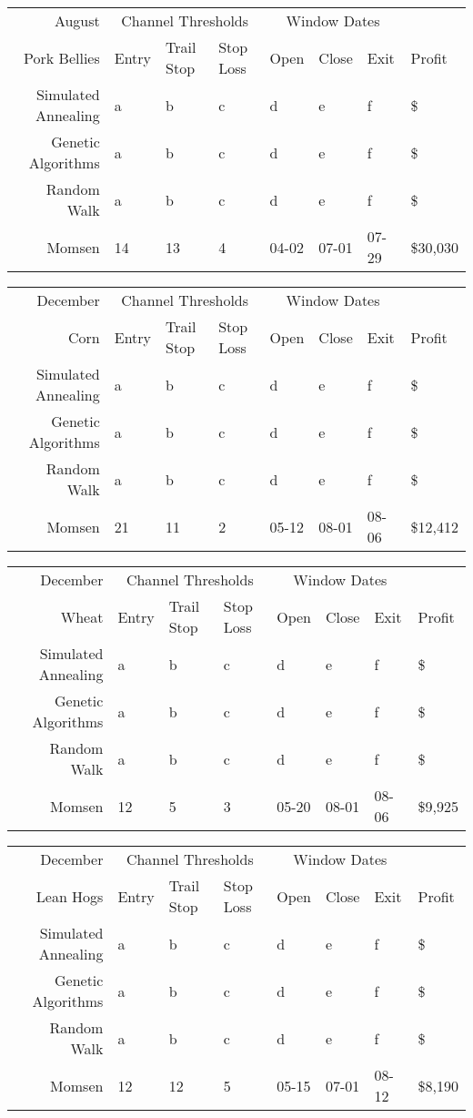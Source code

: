 \documentclass[12pt]{article}
\begin{document}
\begin{tabular}{|r|l|l|l|l|l|l|l|}
  \hline
  August & \multicolumn{3}{|c|}{Channel Thresholds} & \multicolumn{3}{|c|}{Window Dates} &  \\
  Pork Bellies & Entry & Trail Stop & Stop Loss & Open & Close & Exit & Profit\\ \hline
  Simulated Annealing & a & b & c & d & e & f & \$ \\ \hline
  Genetic Algorithms & a & b & c & d & e & f & \$ \\ \hline
  Random Walk & a & b & c & d & e & f & \$ \\ \hline
  Momsen &  14 & 13 & 4 & 04-02 & 07-01 & 07-29 & \$30,030 \\ \hline
\end{tabular}

\begin{tabular}{|r|l|l|l|l|l|l|l|}
  \hline
  December & \multicolumn{3}{|c|}{Channel Thresholds} & \multicolumn{3}{|c|}{Window Dates} &  \\
  Corn & Entry & Trail Stop & Stop Loss & Open & Close & Exit & Profit\\ \hline
  Simulated Annealing & a & b & c & d & e & f & \$ \\ \hline
  Genetic Algorithms & a & b & c & d & e & f & \$ \\ \hline
  Random Walk & a & b & c & d & e & f & \$ \\ \hline
  Momsen & 21 & 11 & 2 & 05-12 & 08-01 & 08-06 & \$12,412 \\ \hline
\end{tabular}

\begin{tabular}{|r|l|l|l|l|l|l|l|}
  \hline
  December & \multicolumn{3}{|c|}{Channel Thresholds} & \multicolumn{3}{|c|}{Window Dates} &  \\
  Wheat & Entry & Trail Stop & Stop Loss & Open & Close & Exit & Profit\\ \hline
  Simulated Annealing & a & b & c & d & e & f & \$ \\ \hline
  Genetic Algorithms & a & b & c & d & e & f & \$ \\ \hline
  Random Walk & a & b & c & d & e & f & \$ \\ \hline
  Momsen & 12 & 5 & 3 & 05-20 & 08-01 & 08-06 & \$9,925 \\ \hline
\end{tabular}

\begin{tabular}{|r|l|l|l|l|l|l|l|}
  \hline
  December  & \multicolumn{3}{|c|}{Channel Thresholds} & \multicolumn{3}{|c|}{Window Dates} &  \\
  Lean Hogs & Entry & Trail Stop & Stop Loss & Open & Close & Exit & Profit\\ \hline
  Simulated Annealing & a & b & c & d & e & f & \$ \\ \hline
  Genetic Algorithms & a & b & c & d & e & f & \$ \\ \hline
  Random Walk & a & b & c & d & e & f & \$ \\ \hline
  Momsen & 12 & 12 & 5 & 05-15 & 07-01 & 08-12 & \$8,190 \\ \hline
\end{tabular}
\end{document}
